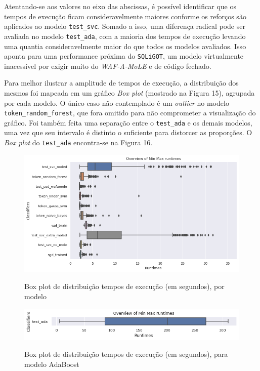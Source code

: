 Atentando-se aos valores no eixo das abscissas, é possível identificar que os tempos de execução ficam consideravelmente maiores conforme os reforços são aplicados ao modelo \verb+test_svc+. Somado a isso, uma diferença radical pode ser avaliada no modelo \verb+test_ada+, com a maioria dos tempos de execução levando uma quantia consideravelmente maior do que todos os modelos avaliados. Isso aponta para uma performance próxima do \verb+SQLiGOT+, um modelo virtualmente inacessível por exigir muito do \textit{WAF-A-MoLE} e de código fechado.

Para melhor ilustrar a amplitude de tempos de execução, a distribuição dos mesmos foi mapeada em um gráfico \textit{Box plot} (mostrado na Figura 15), agrupada por cada modelo. O único caso não contemplado é um \textit{outlier} no modelo \verb+token_random_forest+, que fora omitido para não comprometer a visualização do gráfico. Foi também feita uma separação entre o \verb+test_ada+ e os demais modelos, uma vez que seu intervalo é distinto o suficiente para distorcer as proporções. O \textit{Box plot} do \verb+test_ada+ encontra-se na Figura 16.

\begin{figure}[ht]
    \centering
    \caption{Box plot de distribuição tempos de execução (em segundos), por modelo}
    \includegraphics[width=18cm]{figuras/graficos/min_max_all.png} 
    \label{fig:min-max-all} 
\end{figure}

\begin{figure}[ht]
    \centering
    \caption{Box plot de distribuição tempos de execução (em segundos), para modelo AdaBoost}
    \includegraphics[width=18cm]{figuras/graficos/min_max_ada.png} 
    \label{fig:min-max-ada} 
\end{figure}

